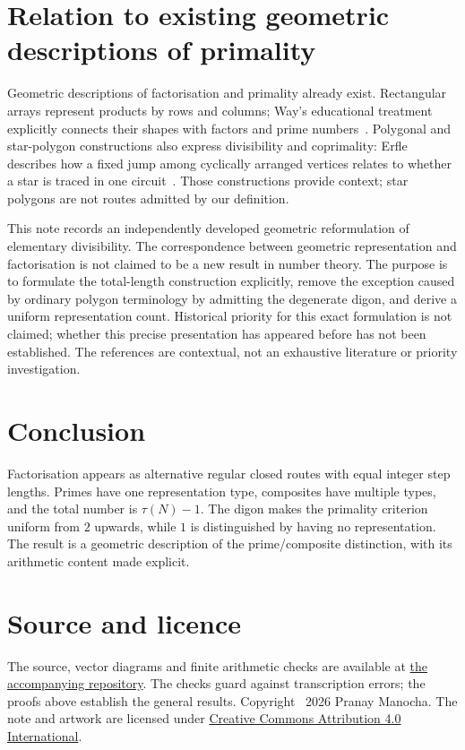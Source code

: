 \documentclass[11pt,a4paper]{article}
\theoremstyle{definition}
\begin{document}
\section{Relation to existing geometric descriptions of primality}
Geometric descriptions of factorisation and primality already exist.
Rectangular arrays represent products by rows and columns; Way's
educational treatment explicitly connects their shapes with factors
and prime numbers~\cite{way2011arrays}. Polygonal and star-polygon
constructions also express divisibility and coprimality: Erfle describes
how a fixed jump among cyclically arranged vertices relates to whether
a star is traced in one circuit~\cite{erfleCoprime}.
Those constructions provide context; star polygons are not routes
admitted by our definition.

This note records an independently developed geometric reformulation
of elementary divisibility. The correspondence between geometric
representation and factorisation is not claimed to be a new result in
number theory. The purpose is to formulate the total-length construction
explicitly, remove the exception caused by ordinary polygon terminology
by admitting the degenerate digon, and derive a uniform representation
count. Historical priority for this exact formulation is not claimed;
whether this precise presentation has appeared before has not been
established. The references are contextual, not an exhaustive literature
or priority investigation.

\section{Conclusion}
Factorisation appears as alternative regular closed routes with equal
integer step lengths. Primes have one representation type, composites
have multiple types, and the total number is $\tau(N)-1$. The digon
makes the primality criterion uniform from $2$ upwards, while $1$ is
distinguished by having no representation. The result is a geometric
description of the prime/composite distinction, with its arithmetic
content made explicit.

\section*{Source and licence}
The source, vector diagrams and finite arithmetic checks are available
at \href{https://github.com/pranman/prime-geometric-characterisation}{the accompanying repository}.
The checks guard against transcription errors; the proofs above establish
the general results. Copyright \textcopyright\ 2026 Pranay Manocha.
The note and artwork are licensed under
\href{https://creativecommons.org/licenses/by/4.0/}{Creative Commons Attribution 4.0 International}.

\begingroup
\small
\raggedright


\endgroup
\end{document}

